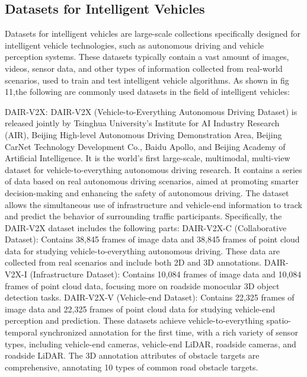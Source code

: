 \documentclass[journal]{IEEEtran}
\begin{document}
\subsection{Datasets for Intelligent Vehicles}

Datasets for intelligent vehicles are large-scale collections specifically designed for intelligent vehicle technologies, such as autonomous driving and vehicle perception systems. These datasets typically contain a vast amount of images, videos, sensor data, and other types of information collected from real-world scenarios, used to train and test intelligent vehicle algorithms. As shown in fig 11,the following are commonly used datasets in the field of intelligent vehicles:

DAIR-V2X\cite{yu2022dair}: DAIR-V2X (Vehicle-to-Everything Autonomous Driving Dataset) is released jointly by Tsinghua University’s Institute for AI Industry Research (AIR), Beijing High-level Autonomous Driving Demonstration Area, Beijing CarNet Technology Development Co., Baidu Apollo, and Beijing Academy of Artificial Intelligence. It is the world’s first large-scale, multimodal, multi-view dataset for vehicle-to-everything autonomous driving research. It contains a series of data based on real autonomous driving scenarios, aimed at promoting smarter decision-making and enhancing the safety of autonomous driving. The dataset allows the simultaneous use of infrastructure and vehicle-end information to track and predict the behavior of surrounding traffic participants. Specifically, the DAIR-V2X dataset includes the following parts:
DAIR-V2X-C (Collaborative Dataset): Contains 38,845 frames of image data and 38,845 frames of point cloud data for studying vehicle-to-everything autonomous driving. These data are collected from real scenarios and include both 2D and 3D annotations.
DAIR-V2X-I (Infrastructure Dataset): Contains 10,084 frames of image data and 10,084 frames of point cloud data, focusing more on roadside monocular 3D object detection tasks.
DAIR-V2X-V (Vehicle-end Dataset): Contains 22,325 frames of image data and 22,325 frames of point cloud data for studying vehicle-end perception and prediction. These datasets achieve vehicle-to-everything spatio-temporal synchronized annotation for the first time, with a rich variety of sensor types, including vehicle-end cameras, vehicle-end LiDAR, roadside cameras, and roadside LiDAR. The 3D annotation attributes of obstacle targets are comprehensive, annotating 10 types of common road obstacle targets.
\end{document}
